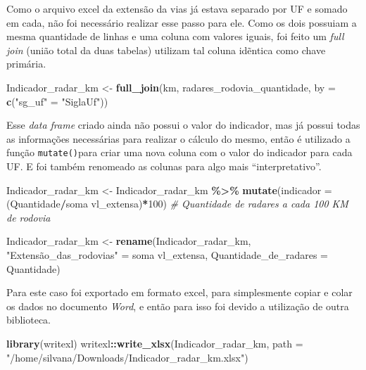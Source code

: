 \documentclass[
]{book}
\newenvironment{Shaded}{\begin{snugshade}}{\end{snugshade}}
\newcommand{\AttributeTok}[1]{\textcolor[rgb]{0.13,0.29,0.53}{#1}}
\newcommand{\CommentTok}[1]{\textcolor[rgb]{0.56,0.35,0.01}{\textit{#1}}}
\newcommand{\DecValTok}[1]{\textcolor[rgb]{0.00,0.00,0.81}{#1}}
\newcommand{\FunctionTok}[1]{\textcolor[rgb]{0.13,0.29,0.53}{\textbf{#1}}}
\newcommand{\NormalTok}[1]{#1}
\newcommand{\OtherTok}[1]{\textcolor[rgb]{0.56,0.35,0.01}{#1}}
\newcommand{\SpecialCharTok}[1]{\textcolor[rgb]{0.81,0.36,0.00}{\textbf{#1}}}
\newcommand{\StringTok}[1]{\textcolor[rgb]{0.31,0.60,0.02}{#1}}
\begin{document}
Como o arquivo excel da extensão da vias já estava separado por UF e somado em cada, não foi necessário realizar esse passo para ele. Como os dois possuiam a mesma quantidade de linhas e uma coluna com valores iguais, foi feito um \emph{full join} (união total da duas tabelas) utilizam tal coluna idẽntica como chave primária.

\begin{Shaded}
\begin{Highlighting}[]
\NormalTok{Indicador\_radar\_km }\OtherTok{\textless{}{-}} \FunctionTok{full\_join}\NormalTok{(km, radares\_rodovia\_quantidade, }\AttributeTok{by =} \FunctionTok{c}\NormalTok{(}\StringTok{"sg\_uf"} \OtherTok{=} \StringTok{"SiglaUf"}\NormalTok{))}
\end{Highlighting}
\end{Shaded}

Esse \emph{data frame} criado ainda não possui o valor do indicador, mas já possui todas as informações necessárias para realizar o cálculo do mesmo, então é utilizado a função \texttt{mutate()}para criar uma nova coluna com o valor do indicador para cada UF. E foi também renomeado as colunas para algo mais ``interpretativo''.

\begin{Shaded}
\begin{Highlighting}[]
\NormalTok{Indicador\_radar\_km }\OtherTok{\textless{}{-}}\NormalTok{ Indicador\_radar\_km }\SpecialCharTok{\%\textgreater{}\%} 
  \FunctionTok{mutate}\NormalTok{(}\AttributeTok{indicador =}\NormalTok{ (Quantidade}\SpecialCharTok{/}\StringTok{\textasciigrave{}}\AttributeTok{soma vl\_extensa}\StringTok{\textasciigrave{}}\NormalTok{)}\SpecialCharTok{*}\DecValTok{100}\NormalTok{) }\CommentTok{\# Quantidade de radares a cada 100 KM de rodovia}

\NormalTok{Indicador\_radar\_km }\OtherTok{\textless{}{-}} \FunctionTok{rename}\NormalTok{(Indicador\_radar\_km, }\StringTok{"Extensão\_das\_rodovias"} \OtherTok{=} \StringTok{\textasciigrave{}}\AttributeTok{soma vl\_extensa}\StringTok{\textasciigrave{}}\NormalTok{,}
       \AttributeTok{Quantidade\_de\_radares =}\NormalTok{ Quantidade)}
\end{Highlighting}
\end{Shaded}

Para este caso foi exportado em formato excel, para simplesmente copiar e colar os dados no documento \emph{Word}, e então para isso foi devido a utilização de outra biblioteca.

\begin{Shaded}
\begin{Highlighting}[]
\FunctionTok{library}\NormalTok{(writexl)}
\NormalTok{writexl}\SpecialCharTok{::}\FunctionTok{write\_xlsx}\NormalTok{(Indicador\_radar\_km, }\AttributeTok{path =} \StringTok{"/home/silvana/Downloads/Indicador\_radar\_km.xlsx"}\NormalTok{)}
\end{Highlighting}
\end{Shaded}
\end{document}
